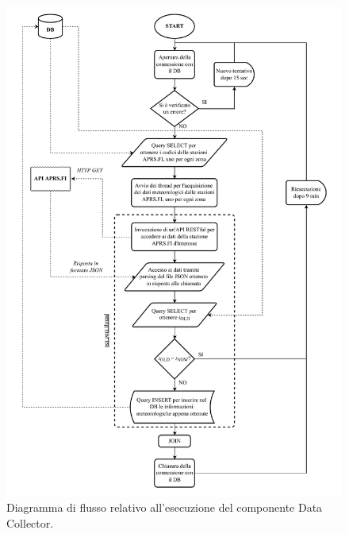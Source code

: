 \begin{figure}[h!]
	\centering
	\includegraphics[width=1\linewidth]{./Iterazione 3/OtherFiles/FC - Data collector}
	\caption{Diagramma di flusso relativo all'esecuzione del componente Data Collector.}
	\label{fig:DCFlowChart}
\end{figure}